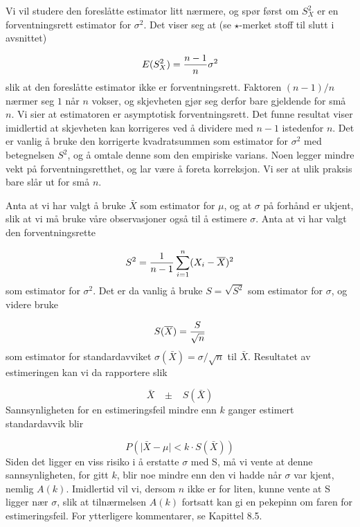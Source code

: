 Vi vil studere den foreslåtte estimator
litt nærmere, og spør først om $S_X^2$ er en
forventningsrett estimator for $\sigma ^2$. Det viser seg at (se
 $\star$-merket stoff til slutt i avsnittet)

\[  E(S_X^2)={n-1\over n}\sigma ^2   \]
slik at den foreslåtte estimator ikke er forventningsrett.
Faktoren $(n-1)/n$ nærmer seg $1$ når $n$ vokser, og
skjevheten gjør seg derfor bare gjeldende for små $n$. Vi
sier at estimatoren er asymptotisk forventningsrett. Det funne
resultat viser imidlertid at skjevheten kan korrigeres ved å
dividere med $n-1$ istedenfor $n$.
Det er vanlig å bruke den korrigerte kvadratsummen som
estimator for $\sigma ^2$ med betegnelsen $S^2$, og å
omtale denne som den empiriske varians. Noen legger mindre vekt
på forventningsretthet, og lar være å foreta korreksjon.
Vi ser at ulik praksis bare slår ut for små $n$.

Anta at vi har valgt å bruke $\bar X$ som estimator for
$\mu$, og at $\sigma$ på forhånd er ukjent, slik at vi
må bruke våre observasjoner også til å estimere
$\sigma$. Anta at vi har valgt den forventningsrette 
     
\[   S^2={1\over {n-1}}\sum_{i=1}^n(X_i-\bar X)^2\]
som estimator for $\sigma ^2$. Det er da vanlig å bruke
 $S=\sqrt{S^2}$ som estimator for $\sigma$, og videre bruke

     \[S(\bar X)={S\over \sqrt n}\]
som estimator for standardavviket $\sigma(\bar X)=\sigma/ \sqrt n$
til $\bar X$. Resultatet av estimeringen kan vi da rapportere slik

\[   \bar X \;\;\; \pm \;\;\; S(\bar X)   \]
Sannsynligheten for en estimeringsfeil mindre enn $k$ ganger
estimert standardavvik blir

\[    P(\mid \bar X -\mu \mid < k\cdot S(\bar X)) \]
Siden det ligger en viss risiko i å erstatte $\sigma$ med S,
må vi vente at denne sannsynligheten, for gitt $k$, blir noe
mindre enn den vi hadde når $\sigma$ var kjent, nemlig $A(k)$.
Imidlertid vil vi, dersom $n$ ikke er for liten, kunne vente at S
ligger nær $\sigma$, slik at tilnærmelsen $A(k)$ fortsatt
kan gi en pekepinn om faren for estimeringsfeil. For ytterligere
kommentarer, se Kapittel 8.5.\\


